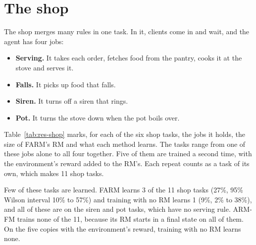 \documentclass[11pt,english,listoffigures,listoftables]{tfgetsinf}
\begin{document}
\section{The shop}
\label{sec:res-shop}

The shop merges many rules in one task. In it, clients come in and wait, and the agent has four jobs:
\begin{itemize}
    \item \textbf{Serving.} It takes each order, fetches food from the pantry, cooks it at the stove and serves it.
    \item \textbf{Falls.} It picks up food that falls.
    \item \textbf{Siren.} It turns off a siren that rings.
    \item \textbf{Pot.} It turns the stove down when the pot boils over.
\end{itemize}
Table~\ref{tab:res-shop} marks, for each of the six shop tasks, the jobs it holds, the size of FARM's RM and what each method learns. The tasks range from one of these jobs alone to all four together. Five of them are trained a second time, with the environment's reward added to the RM's. Each repeat counts as a task of its own, which makes 11 shop tasks.

Few of these tasks are learned. FARM learns 3 of the 11 shop tasks (27\%, 95\% Wilson interval 10\% to 57\%) and training with no RM learns 1 (9\%, 2\% to 38\%), and all of these are on the siren and pot tasks, which have no serving rule. ARM-FM trains none of the 11, because its RM starts in a final state on all of them. On the five copies with the environment's reward, training with no RM learns none.
\end{document}
